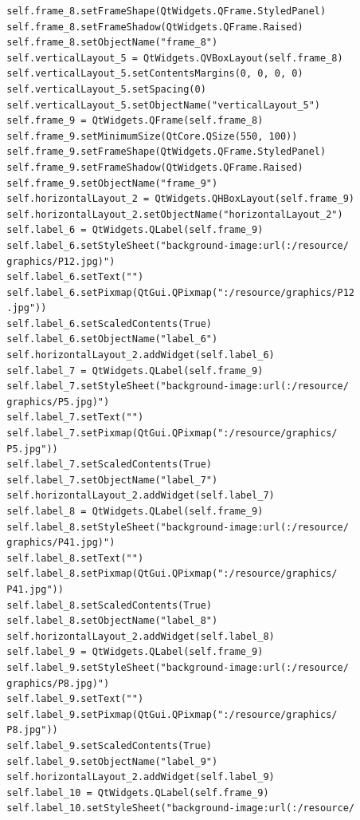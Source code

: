 \documentclass[12pt]{article}
\begin{document}
\begin{verbatim}
        self.frame_8.setFrameShape(QtWidgets.QFrame.StyledPanel)
        self.frame_8.setFrameShadow(QtWidgets.QFrame.Raised)
        self.frame_8.setObjectName("frame_8")
        self.verticalLayout_5 = QtWidgets.QVBoxLayout(self.frame_8)
        self.verticalLayout_5.setContentsMargins(0, 0, 0, 0)
        self.verticalLayout_5.setSpacing(0)
        self.verticalLayout_5.setObjectName("verticalLayout_5")
        self.frame_9 = QtWidgets.QFrame(self.frame_8)
        self.frame_9.setMinimumSize(QtCore.QSize(550, 100))
        self.frame_9.setFrameShape(QtWidgets.QFrame.StyledPanel)
        self.frame_9.setFrameShadow(QtWidgets.QFrame.Raised)
        self.frame_9.setObjectName("frame_9")
        self.horizontalLayout_2 = QtWidgets.QHBoxLayout(self.frame_9)
        self.horizontalLayout_2.setObjectName("horizontalLayout_2")
        self.label_6 = QtWidgets.QLabel(self.frame_9)
        self.label_6.setStyleSheet("background-image:url(:/resource/
        graphics/P12.jpg)")
        self.label_6.setText("")
        self.label_6.setPixmap(QtGui.QPixmap(":/resource/graphics/P12
        .jpg"))
        self.label_6.setScaledContents(True)
        self.label_6.setObjectName("label_6")
        self.horizontalLayout_2.addWidget(self.label_6)
        self.label_7 = QtWidgets.QLabel(self.frame_9)
        self.label_7.setStyleSheet("background-image:url(:/resource/
        graphics/P5.jpg)")
        self.label_7.setText("")
        self.label_7.setPixmap(QtGui.QPixmap(":/resource/graphics/
        P5.jpg"))
        self.label_7.setScaledContents(True)
        self.label_7.setObjectName("label_7")
        self.horizontalLayout_2.addWidget(self.label_7)
        self.label_8 = QtWidgets.QLabel(self.frame_9)
        self.label_8.setStyleSheet("background-image:url(:/resource/
        graphics/P41.jpg)")
        self.label_8.setText("")
        self.label_8.setPixmap(QtGui.QPixmap(":/resource/graphics/
        P41.jpg"))
        self.label_8.setScaledContents(True)
        self.label_8.setObjectName("label_8")
        self.horizontalLayout_2.addWidget(self.label_8)
        self.label_9 = QtWidgets.QLabel(self.frame_9)
        self.label_9.setStyleSheet("background-image:url(:/resource/
        graphics/P8.jpg)")
        self.label_9.setText("")
        self.label_9.setPixmap(QtGui.QPixmap(":/resource/graphics/
        P8.jpg"))
        self.label_9.setScaledContents(True)
        self.label_9.setObjectName("label_9")
        self.horizontalLayout_2.addWidget(self.label_9)
        self.label_10 = QtWidgets.QLabel(self.frame_9)
        self.label_10.setStyleSheet("background-image:url(:/resource/

\end{verbatim}
\end{document}
